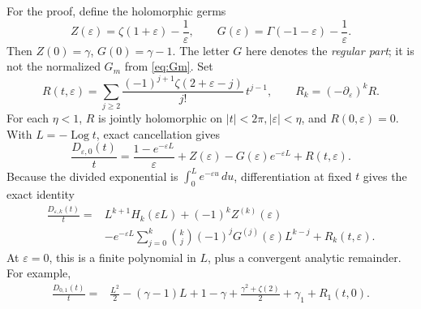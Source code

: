 \documentclass[11pt,a4paper]{article}
\numberwithin{equation}{section}
\theoremstyle{definition}
\theoremstyle{remark}
\DeclareMathOperator{\Log}{Log}
\newcommand{\dd}{\,d}
\newcommand{\eps}{\varepsilon}
\begin{document}
For the proof, define the holomorphic germs
\begin{equation}
 Z(\eps)=\zeta(1+\eps)-\frac1\eps,\qquad
 G(\eps)=\Gamma(-1-\eps)-\frac1\eps.
 \label{eq:ZG}
\end{equation}
Then \(Z(0)=\gamma\), \(G(0)=\gamma-1\).
The letter \(G\) here denotes the \emph{regular part}; it is not the
normalized \(G_m\) from \eqref{eq:Gm}.
Set
\begin{equation}
 R(t,\eps)=
 \sum_{j\ge2}\frac{(-1)^{j+1}\zeta(2+\eps-j)}{j!}\,t^{j-1},
 \qquad R_k=(-\partial_\eps)^kR.
 \label{eq:Rcritical}
\end{equation}
For each \(\eta<1\), \(R\) is jointly holomorphic on
\(|t|<2\pi,|\eps|<\eta\), and \(R(0,\eps)=0\).
With \(L=-\Log t\), exact cancellation gives
\[
 \frac{D_{\eps,0}(t)}t=
 \frac{1-e^{-\eps L}}{\eps}+
 Z(\eps)-G(\eps)e^{-\eps L}+R(t,\eps).
\]
Because the divided exponential is
\(\int_0^L e^{-\eps u}\dd u\), differentiation at fixed \(t\) gives
the exact identity
\begin{align}
 \frac{D_{\eps,k}(t)}t={}&
 L^{k+1}H_k(\eps L)+(-1)^kZ^{(k)}(\eps)
 \nonumber\\
 &-e^{-\eps L}\sum_{j=0}^k
 \binom{k}{j}(-1)^jG^{(j)}(\eps)L^{k-j}
 +R_k(t,\eps).
 \label{eq:weighted-cancelled}
\end{align}
At \(\eps=0\), this is a finite polynomial in \(L\), plus a convergent
analytic remainder.  For example,
\begin{align}
 \frac{D_{0,1}(t)}t={}&
 \frac{L^2}{2}-(\gamma-1)L
 +1-\gamma+\frac{\gamma^2+\zeta(2)}2+\gamma_1
 +R_1(t,0).
 \label{eq:critical-weight-one}
\end{align}
\end{document}
